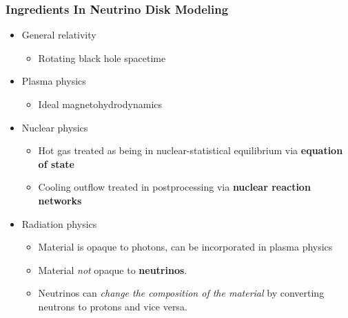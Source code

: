 \documentclass[]{beamer}
\begin{document}
\begin{frame}
  \frametitle{Ingredients In Neutrino Disk Modeling}
  \begin{itemize}
  \item General relativity
    \begin{itemize}
    \item Rotating black hole spacetime
    \end{itemize}
  \item Plasma physics
    \begin{itemize}
    \item Ideal magnetohydrodynamics
    \end{itemize}
  \item Nuclear physics
    \begin{itemize}
    \item Hot gas treated as being in nuclear-statistical equilibrium via \textbf{equation of state}
    \item Cooling outflow treated in postprocessing via \textbf{nuclear reaction networks}
    \end{itemize}
  \item Radiation physics
    \begin{itemize}
    \item Material is opaque to photons, can be incorporated in plasma physics
    \item Material \textit{not} opaque to \textbf{neutrinos}.
    \item Neutrinos can \textit{change the composition of the
        material} by converting neutrons to protons and vice versa.
    \end{itemize}
  \end{itemize}
\end{frame}
\end{document}
